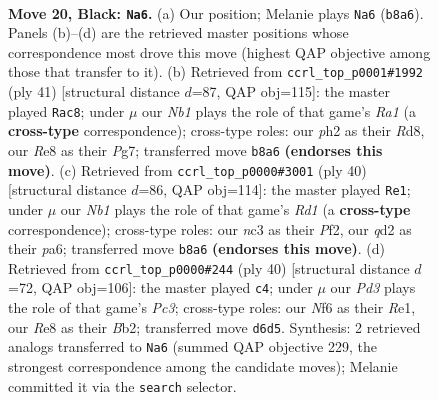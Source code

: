 \documentclass[11pt]{article}
\begin{document}
\clearpage

\begin{figure}[p]\centering
\begin{subfigure}{0.46\textwidth}\centering
\resizebox{\linewidth}{!}{%
\newchessgame
\chessboard[
  setfen={1nb1r1k1/r3qpp1/1p1p1n2/4p2p/P1B1P3/2N2NP1/2PQ1P1P/R1R3K1 b - - 2 20},
  showmover=false,
  pgfstyle=straightmove, color=movearrow, markmove={b8-a6}
]}
\caption{}
\end{subfigure}\hfill
\begin{subfigure}{0.46\textwidth}\centering
\resizebox{\linewidth}{!}{%
\newchessgame
\chessboard[
  setfen={r2rq1k1/1p3pp1/p1nb1n1p/4p3/1P2P3/PQ3N1P/1B1N1PP1/2R1R1K1 b - - 7 21},
  showmover=false,
  pgfstyle=straightmove, color=movearrow, markmove={a8-c8}
]}
\caption{}
\end{subfigure}
\\[4pt]
\begin{subfigure}{0.46\textwidth}\centering
\resizebox{\linewidth}{!}{%
\newchessgame
\chessboard[
  setfen={5rk1/1p1rnpp1/p1qp1n1p/4p3/4P3/PB3N1P/1PPRQPP1/3R2K1 w - - 3 21},
  showmover=false,
  pgfstyle=straightmove, color=movearrow, markmove={d1-e1}
]}
\caption{}
\end{subfigure}\hfill
\begin{subfigure}{0.46\textwidth}\centering
\resizebox{\linewidth}{!}{%
\newchessgame
\chessboard[
  setfen={r3r1k1/1p1q1pp1/2p2nnp/p1b1p3/P7/1PPP1NNP/1BQ2PP1/3RR1K1 w - - 5 21},
  showmover=false,
  pgfstyle=straightmove, color=movearrow, markmove={c3-c4}
]}
\caption{}
\end{subfigure}
\caption{\textbf{Move 20, Black: \texttt{Na6}.} (a) Our position; Melanie plays \texttt{Na6} (\texttt{b8a6}). Panels (b)--(d) are the retrieved master positions whose correspondence most drove this move (highest QAP objective among those that transfer to it). (b) Retrieved from \texttt{ccrl\_top\_p0001\#1992} (ply 41) [structural distance $d$=87, QAP obj=115]: the master played \texttt{Rac8}; under $\mu$ our \emph{Nb1} plays the role of that game's \emph{Ra1} (a \textbf{cross-type} correspondence); cross-type roles: our \emph{p}h2 as their \emph{R}d8, our \emph{R}e8 as their \emph{P}g7; transferred move \texttt{b8a6} \textbf{(endorses this move)}. (c) Retrieved from \texttt{ccrl\_top\_p0000\#3001} (ply 40) [structural distance $d$=86, QAP obj=114]: the master played \texttt{Re1}; under $\mu$ our \emph{Nb1} plays the role of that game's \emph{Rd1} (a \textbf{cross-type} correspondence); cross-type roles: our \emph{n}c3 as their \emph{P}f2, our \emph{q}d2 as their \emph{p}a6; transferred move \texttt{b8a6} \textbf{(endorses this move)}. (d) Retrieved from \texttt{ccrl\_top\_p0000\#244} (ply 40) [structural distance $d$=72, QAP obj=106]: the master played \texttt{c4}; under $\mu$ our \emph{Pd3} plays the role of that game's \emph{Pc3}; cross-type roles: our \emph{N}f6 as their \emph{R}e1, our \emph{R}e8 as their \emph{B}b2; transferred move \texttt{d6d5}. Synthesis: 2 retrieved analogs transferred to \texttt{Na6} (summed QAP objective 229, the strongest correspondence among the candidate moves); Melanie committed it via the \texttt{search} selector.}
\label{fig:thought-m39}
\end{figure}
\end{document}
